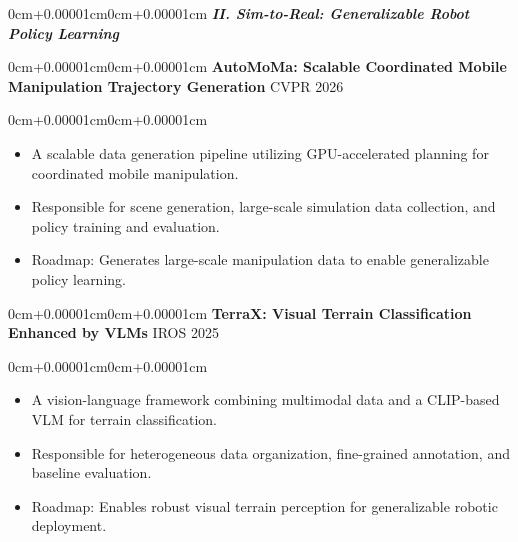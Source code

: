 \documentclass[10pt, letterpaper]{article}
\newenvironment{highlights}{\begin{itemize}[topsep=0.10cm,parsep=0.10cm,partopsep=0pt,itemsep=0pt,leftmargin=0cm+10pt]}{\end{itemize}}
\newenvironment{onecolentry}{\begin{adjustwidth}{0cm+0.00001cm}{0cm+0.00001cm}}{\end{adjustwidth}}
\begin{document}
    \vspace{0.3cm}
    \begin{onecolentry}
        \textbf{\textit{II. Sim-to-Real: Generalizable Robot Policy Learning}}
    \end{onecolentry}
    \vspace{0.1cm}

    \begin{onecolentry}
        \textbf{AutoMoMa: Scalable Coordinated Mobile Manipulation Trajectory Generation} 
        \hfill CVPR 2026
    \end{onecolentry}
    \begin{onecolentry}
        \begin{highlights}
        \item A scalable data generation pipeline utilizing GPU-accelerated planning for coordinated mobile manipulation.
        \item Responsible for scene generation, large-scale simulation data collection, and policy training and evaluation.
        \item Roadmap: Generates large-scale manipulation data to enable generalizable policy learning.\hspace{4pt}\robdot
        \end{highlights}
    \end{onecolentry}

    \vspace{0.15cm}

    \begin{onecolentry}
        \textbf{TerraX: Visual Terrain Classification Enhanced by VLMs} 
        \hfill IROS 2025
    \end{onecolentry}
    \begin{onecolentry}
        \begin{highlights}
        \item A vision-language framework combining multimodal data and a CLIP-based VLM for terrain classification.
        \item Responsible for heterogeneous data organization, fine-grained annotation, and baseline evaluation.
        \item Roadmap: Enables robust visual terrain perception for generalizable robotic deployment.\hspace{4pt}\cvdot\hspace{2.5pt}\robdot
        \end{highlights}
    \end{onecolentry}
\end{document}
